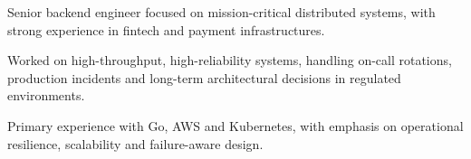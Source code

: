 

\begin{cvparagraph}

Senior backend engineer focused on mission-critical distributed systems, with strong experience in fintech and payment infrastructures.

Worked on high-throughput, high-reliability systems, handling on-call rotations, production incidents and long-term architectural decisions in regulated environments.

Primary experience with Go, AWS and Kubernetes, with emphasis on operational resilience, scalability and failure-aware design.
\end{cvparagraph}

